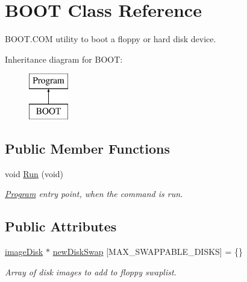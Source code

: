 \hypertarget{classBOOT}{\section{B\-O\-O\-T Class Reference}
\label{classBOOT}
}


B\-O\-O\-T.\-C\-O\-M utility to boot a floppy or hard disk device.  


Inheritance diagram for B\-O\-O\-T\-:\begin{figure}[H]
\begin{center}
\leavevmode
\includegraphics[height=2.000000cm]{classBOOT}
\end{center}
\end{figure}
\subsection*{Public Member Functions}
\begin{DoxyCompactItemize}
\item 
\hypertarget{classBOOT_a246ff7f80fc219360cdef4c3faa93d40}{void \hyperlink{classBOOT_a246ff7f80fc219360cdef4c3faa93d40}{Run} (void)}\label{classBOOT_a246ff7f80fc219360cdef4c3faa93d40}

\begin{DoxyCompactList}\small\item\em \hyperlink{classProgram}{Program} entry point, when the command is run. \end{DoxyCompactList}\end{DoxyCompactItemize}
\subsection*{Public Attributes}
\begin{DoxyCompactItemize}
\item 
\hypertarget{classBOOT_ab165a586fbff98d26e21fba090440209}{\hyperlink{classimageDisk}{image\-Disk} $\ast$ \hyperlink{classBOOT_ab165a586fbff98d26e21fba090440209}{new\-Disk\-Swap} \mbox{[}M\-A\-X\-\_\-\-S\-W\-A\-P\-P\-A\-B\-L\-E\-\_\-\-D\-I\-S\-K\-S\mbox{]} = \{\}}\label{classBOOT_ab165a586fbff98d26e21fba090440209}

\begin{DoxyCompactList}\small\item\em Array of disk images to add to floppy swaplist. \end{DoxyCompactList}\end{DoxyCompactItemize}


